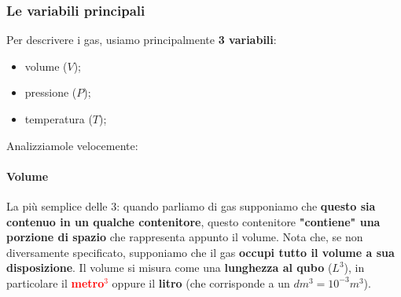         \subsubsection{Le variabili principali}
          Per descrivere i gas, usiamo principalmente \textbf{3 variabili}:
          \begin{itemize}
              \item volume ($V$);
              \item pressione ($P$);
              \item temperatura ($T$);
          \end{itemize}
          Analizziamole velocemente:
            \paragraph{Volume}
                La più semplice delle 3: quando parliamo di gas supponiamo che \textbf{questo sia contenuo in un qualche contenitore}, questo contenitore \textbf{"contiene" una porzione di spazio} che rappresenta appunto il volume. Nota che, se non diversamente specificato, supponiamo che il gas \textbf{occupi tutto il volume a sua disposizione}. Il volume si misura come una \textbf{lunghezza al qubo} ($L^3$), in particolare il \textcolor{Red}{\textbf{metro$^3$}} oppure il \textbf{litro} (che corrisponde a un $dm^3 = 10^{-3}m^3$).
